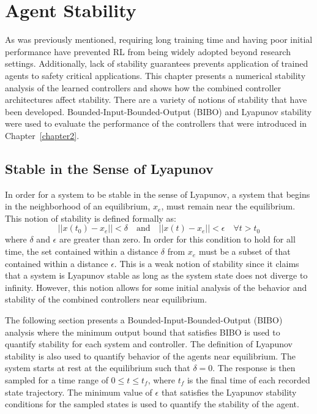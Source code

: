 

\chapter{Agent Stability}
\label{chapter3}

As was previously mentioned, requiring long training time and having poor initial performance have prevented RL from being widely adopted beyond research settings. Additionally, lack of stability guarantees prevents application of trained agents to safety critical applications. This chapter presents a numerical stability analysis of the learned controllers and shows how the combined controller architectures affect stability.
%
There are a variety of notions of stability that have been developed. Bounded-Input-Bounded-Output (BIBO) and Lyapunov stability were used to evaluate the performance of the controllers that were introduced in Chapter~\ref{chapter2}.

\section{Stable in the Sense of Lyapunov}

In order for a system to be stable in the sense of Lyapunov, a system that begins in the neighborhood of an equilibrium, $x_e$, must remain near the equilibrium. This notion of stability is defined formally as:
%
\begin{equation}
  ||x(t_0)-x_e||<\delta \quad \text{and} \quad ||x(t)-x_e||<\epsilon \quad \forall t>t_0
\end{equation}
%
where $\delta$ and $\epsilon$ are greater than zero. In order for this condition to hold for all time, the set contained within a distance $\delta$ from $x_e$ must be a subset of that contained within a distance $\epsilon$. This is a weak notion of stability since it claims that a system is Lyapunov stable as long as the system state does not diverge to infinity. However, this notion allows for some initial analysis of the behavior and stability of the combined controllers near equilibrium.

The following section presents a Bounded-Input-Bounded-Output (BIBO) analysis where the minimum output bound that satisfies BIBO is used to quantify stability for each system and controller. The definition of Lyapunov stability is also used to quantify behavior of the agents near equilibrium. The system starts at rest at the equilibrium such that $\delta=0$. The response is then sampled for a time range of $0\leq t \leq t_f$, where $t_f$ is the final time of each recorded state trajectory. The minimum value of $\epsilon$ that satisfies the Lyapunov stability conditions for the sampled states is used to quantify the stability of the agent.

